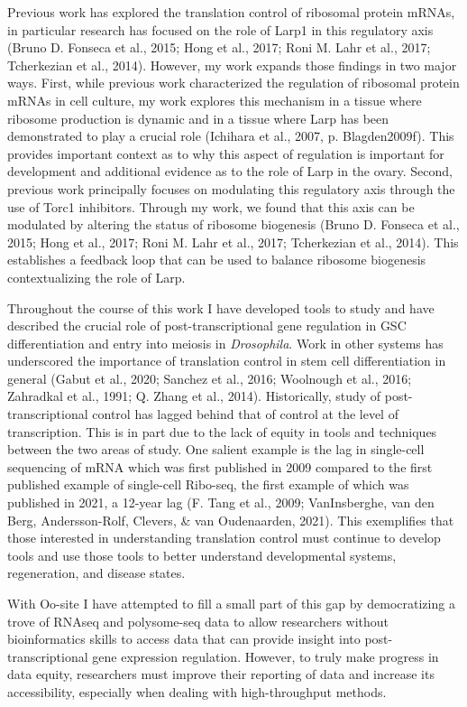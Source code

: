 \documentclass[12pt,oneside]{reedthesis}
\begin{document}
Previous work has explored the translation control of ribosomal protein mRNAs, in particular research has focused on the role of Larp1 in this regulatory axis (Bruno D. Fonseca et al., 2015; Hong et al., 2017; Roni M. Lahr et al., 2017; Tcherkezian et al., 2014). However, my work expands those findings in two major ways. First, while previous work characterized the regulation of ribosomal protein mRNAs in cell culture, my work explores this mechanism in a tissue where ribosome production is dynamic and in a tissue where Larp has been demonstrated to play a crucial role (Ichihara et al., 2007, p. Blagden2009f). This provides important context as to why this aspect of regulation is important for development and additional evidence as to the role of Larp in the ovary. Second, previous work principally focuses on modulating this regulatory axis through the use of Torc1 inhibitors. Through my work, we found that this axis can be modulated by altering the status of ribosome biogenesis (Bruno D. Fonseca et al., 2015; Hong et al., 2017; Roni M. Lahr et al., 2017; Tcherkezian et al., 2014). This establishes a feedback loop that can be used to balance ribosome biogenesis contextualizing the role of Larp.

Throughout the course of this work I have developed tools to study and have described the crucial role of post-transcriptional gene regulation in GSC differentiation and entry into meiosis in \emph{Drosophila}. Work in other systems has underscored the importance of translation control in stem cell differentiation in general (Gabut et al., 2020; Sanchez et al., 2016; Woolnough et al., 2016; Zahradkal et al., 1991; Q. Zhang et al., 2014). Historically, study of post-transcriptional control has lagged behind that of control at the level of transcription. This is in part due to the lack of equity in tools and techniques between the two areas of study. One salient example is the lag in single-cell sequencing of mRNA which was first published in 2009 compared to the first published example of single-cell Ribo-seq, the first example of which was published in 2021, a 12-year lag (F. Tang et al., 2009; VanInsberghe, van den Berg, Andersson-Rolf, Clevers, \& van Oudenaarden, 2021). This exemplifies that those interested in understanding translation control must continue to develop tools and use those tools to better understand developmental systems, regeneration, and disease states.

With Oo-site I have attempted to fill a small part of this gap by democratizing a trove of RNAseq and polysome-seq data to allow researchers without bioinformatics skills to access data that can provide insight into post-transcriptional gene expression regulation. However, to truly make progress in data equity, researchers must improve their reporting of data and increase its accessibility, especially when dealing with high-throughput methods.
\end{document}
